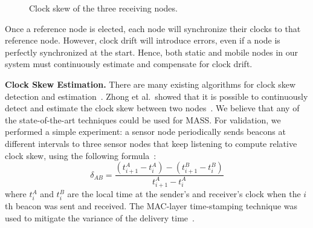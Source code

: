 \documentclass[twoside,twocolumn]{article}
\begin{document}
\begin{figure}[t]
   \caption{Clock skew of the three receiving nodes.}
   \label{fig:skew}
\end{figure}


Once a reference node is elected, each node will synchronize their
clocks to that reference node. However, clock drift will introduce
errors, even if a node is perfectly synchronized at the start.  Hence,
both static and mobile nodes in our system must continuously estimate
and compensate for clock drift.

{\bf Clock Skew Estimation.}  There are many existing algorithms for
clock skew detection and
estimation~\citep{hamilton2008aces,yang2010adaptive,liao2013distributed}.
Zhong et al.\ showed that it is possible to continuously detect and
estimate the clock skew between two nodes~\citep{zhong2011demand}.  We
believe that any of the state-of-the-art techniques could be used for
MASS. For validation, we performed a simple experiment: a sensor node
periodically sends beacons at different intervals to three sensor
nodes that keep listening to compute relative clock skew, using the
following formula~\citep{huang2013psr, xu2013taco}:
\[
	\delta_{AB} = \frac{(t^A_{i+1} - t^A_i) - (t^B_{i+1} - t^B_i)}
	{t^A_{i+1} - t^A_i}
\]
where $t^A_i$ and $t^B_i$ are the local time at the sender's and
receiver's clock when the $i$th beacon was sent and received. The
MAC-layer time-stamping technique was used to mitigate the variance of
the delivery time~\citep{maroti2004flooding}.
\end{document}
